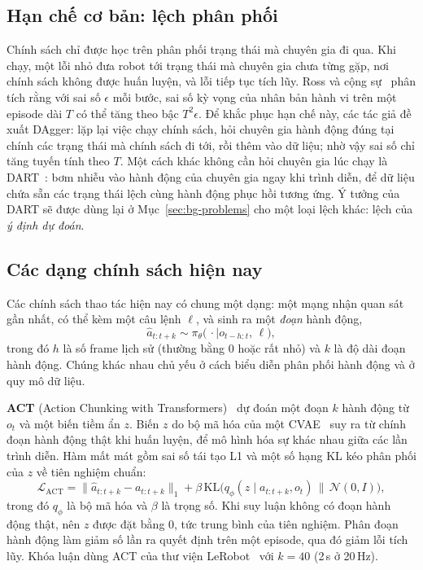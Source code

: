 \subsection{Hạn chế cơ bản: lệch phân phối}

Chính sách chỉ được học trên phân phối trạng thái mà chuyên gia đi qua. Khi chạy, một lỗi nhỏ đưa robot tới trạng thái mà chuyên gia chưa từng gặp, nơi chính sách không được huấn luyện, và lỗi tiếp tục tích lũy. Ross và cộng sự~\cite{ross2011dagger} phân tích rằng với sai số $\epsilon$ mỗi bước, sai số kỳ vọng của nhân bản hành vi trên một episode dài $T$ có thể tăng theo bậc $T^2\epsilon$. Để khắc phục hạn chế này, các tác giả đề xuất DAgger: lặp lại việc chạy chính sách, hỏi chuyên gia hành động đúng tại chính các trạng thái mà chính sách đi tới, rồi thêm vào dữ liệu; nhờ vậy sai số chỉ tăng tuyến tính theo $T$. Một cách khác không cần hỏi chuyên gia lúc chạy là DART~\cite{laskey2017dart}: bơm nhiễu vào hành động của chuyên gia ngay khi trình diễn, để dữ liệu chứa sẵn các trạng thái lệch cùng hành động phục hồi tương ứng. Ý tưởng của DART sẽ được dùng lại ở Mục~\ref{sec:bg-problems} cho một loại lệch khác: lệch của \emph{ý định dự đoán}.

\subsection{Các dạng chính sách hiện nay}

Các chính sách thao tác hiện nay có chung một dạng: một mạng nhận quan sát gần nhất, có thể kèm một câu lệnh $\ell$, và sinh ra một \emph{đoạn} hành động,
\begin{equation}
  \hat a_{t:t+k}\sim\pi_\theta\big(\,\cdot\mid o_{t-h:t},\,\ell\big),
  \label{eq:policy-form}
\end{equation}
trong đó $h$ là số frame lịch sử (thường bằng 0 hoặc rất nhỏ) và $k$ là độ dài đoạn hành động. Chúng khác nhau chủ yếu ở cách biểu diễn phân phối hành động và ở quy mô dữ liệu.

\textbf{ACT} (Action Chunking with Transformers)~\cite{zhao2023act} dự đoán một đoạn $k$ hành động từ $o_t$ và một biến tiềm ẩn $z$. Biến $z$ do bộ mã hóa của một CVAE~\cite{sohn2015cvae} suy ra từ chính đoạn hành động thật khi huấn luyện, để mô hình hóa sự khác nhau giữa các lần trình diễn. Hàm mất mát gồm sai số tái tạo L1 và một số hạng KL kéo phân phối của $z$ về tiên nghiệm chuẩn:
\begin{equation}
  \mathcal{L}_{\text{ACT}}=\big\|\hat{a}_{t:t+k}-a_{t:t+k}\big\|_1+\beta\,\mathrm{KL}\big(q_\phi(z\mid a_{t:t+k},o_t)\,\big\|\,\mathcal{N}(0,I)\big),
  \label{eq:act}
\end{equation}
trong đó $q_\phi$ là bộ mã hóa và $\beta$ là trọng số. Khi suy luận không có đoạn hành động thật, nên $z$ được đặt bằng $0$, tức trung bình của tiên nghiệm. Phân đoạn hành động làm giảm số lần ra quyết định trên một episode, qua đó giảm lỗi tích lũy. Khóa luận dùng ACT của thư viện LeRobot~\cite{cadene2026lerobot} với $k=40$ (2\,s ở 20\,Hz).

